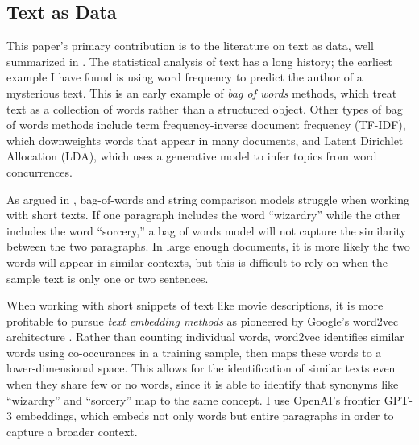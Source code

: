 \documentclass{article}
\begin{document}
\subsection{Text as Data}

This paper's primary contribution is to the literature on text as data, well summarized in \textcite{gentzkow2019EL}. The statistical analysis of text has a long history; the earliest example I have found is \textcite{mendenhall1887S} using word frequency to predict the author of a mysterious text. This is an early example of \emph{bag of words} methods, which treat text as a collection of words rather than a structured object. Other types of bag of words methods include term frequency-inverse document frequency (TF-IDF), which downweights words that appear in many documents, and Latent Dirichlet Allocation (LDA), which uses a generative model to infer topics from word concurrences.

As argued in \textcite{kenter2015P2AICIKM}, bag-of-words and string comparison models struggle when working with short texts. If one paragraph includes the word ``wizardry'' while the other includes the word ``sorcery,'' a bag of words model will not capture the similarity between the two paragraphs. In large enough documents, it is more likely the two words will appear in similar contexts, but this is difficult to rely on when the sample text is only one or two sentences. 

When working with short snippets of text like movie descriptions, it is more profitable to pursue \emph{text embedding methods} as pioneered by Google's word2vec architecture \parencite{mikolov2013}. Rather than counting individual words, word2vec identifies similar words using co-occurances in a training sample, then maps these words to a lower-dimensional space. This allows for the identification of similar texts even when they share few or no words, since it is able to identify that synonyms like ``wizardry'' and ``sorcery'' map to the same concept. I use OpenAI's frontier GPT-3 embeddings, which embeds not only words but entire paragraphs in order to capture a broader context.

\end{document}
